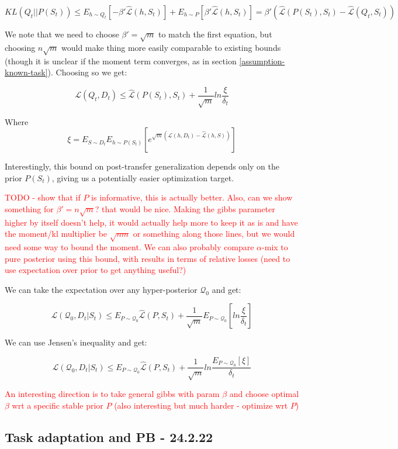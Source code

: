 \documentclass[letterpaper]{article}
\theoremstyle{definition}
\begin{document}
$$KL(Q_t||P(S_t))\leq E_{h\sim Q_t}\left [-\beta'\hat{\mathcal{L}}(h, S_t) \right ]+E_{h\sim P}\left [\beta'\hat{\mathcal{L}}(h, S_t) \right ]=\beta'\left (\hat{\mathcal{L}}(P(S_t), S_t)-\hat{\mathcal{L}}(Q_t, S_t) \right )$$

We note that we need to choose $\beta'=\sqrt{m}$ to match the first equation, but choosing $n\sqrt{m}$ would make thing more easily comparable to existing bounds (though it is unclear if the moment term converges, as in section \ref{assumption-known-task}). Choosing so we get: 

$$\mathcal{L}(Q_t, D_t) \leq \hat{\mathcal{L}}(P(S_t), S_t) + \frac{1}{\sqrt{m}}ln\frac{\xi}{\delta_t}$$

Where $$\xi=E_{S\sim D_t}E_{h\sim P(S_t)}\left [e^{\sqrt{m}(\mathcal{L}(h, D_t)-\hat{\mathcal{L}}(h, S))} \right ]$$

Interestingly, this bound on post-transfer generalization depends only on the prior $P(S_t)$, giving us a potentially easier optimization target.

\textcolor{red}{TODO - show that if $P$ is informative, this is actually better. Also, can we show something for $\beta'=n\sqrt{m}$? that would be nice. Making the gibbs parameter higher by itself doesn't help, it would actually help more to keep it as is and have the moment/kl multiplier be $\sqrt{nm}$ or something along those lines, but we would need some way to bound the moment.
	We can also probably compare $\alpha$-mix to pure posterior using this bound, with results in terms of relative losses (need to use expectation over prior to get anything useful?)}

We can take the expectation over any hyper-posterior $\mathcal{Q}_0$ and get:

$$\mathcal{L}(\mathcal{Q}_0, D_t|S_t) \leq E_{P\sim \mathcal{Q}_0}\hat{\mathcal{L}}(P, S_t) + \frac{1}{\sqrt{m}}E_{P\sim \mathcal{Q}_0}\left [ln\frac{\xi}{\delta_t}\right ]$$

We can use Jensen's inequality and get:

$$\mathcal{L}(\mathcal{Q}_0, D_t|S_t) \leq E_{P\sim \mathcal{Q}_0}\hat{\mathcal{L}}(P, S_t) + \frac{1}{\sqrt{m}}ln\frac{E_{P\sim \mathcal{Q}_0}\left [\xi\right ]}{\delta_t}$$

\textcolor{red}{An interesting direction is to take general gibbs with param $\beta$ and choose optimal $\beta$ wrt a specific stable prior $P$ (also interesting but much harder - optimize wrt $P$)}

\subsection{Task adaptation and PB - 24.2.22} \label{subsec:pb-adapt}
\end{document}
